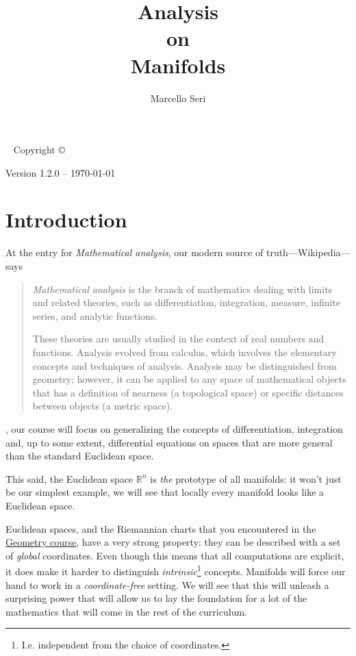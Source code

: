 \documentclass[nobib, a4paper]{tufte-book}
\title{Analysis\\ \noindent
  on\\ \noindent
  Manifolds
}
\author{Marcello Seri}
\theoremstyle{plain}
\theoremstyle{definition}
\theoremstyle{remark}
\newcommand{\R}{\mathbb{R}}
\begin{document}
\maketitlepage

\newpage

\begin{fullwidth}
  ~\vfill
  \thispagestyle{empty}
  \setlength{\parindent}{0pt}
  \setlength{\parskip}{\baselineskip}
  Copyright \copyright\ \the\year\ \thanklessauthor

  \par Version 1.2.0 -- \today

  \vfill
  \small{\doclicenseThis}
\end{fullwidth}

\tableofcontents
\cleardoublepage

\chapter*{Introduction}

At the entry for \emph{Mathematical analysis}, our modern source of truth---Wikipedia---says

\begin{quotation}
  \emph{Mathematical analysis} is the branch of mathematics dealing with limits and related theories, such as differentiation, integration, measure, infinite series, and analytic functions.

  These theories are usually studied in the context of real numbers and functions. Analysis evolved from calculus, which involves the elementary concepts and techniques of analysis. Analysis may be distinguished from geometry; however, it can be applied to any space of mathematical objects that has a definition of nearness (a topological space) or specific distances between objects (a metric space).
\end{quotation}

, our course will focus on generalizing the concepts of differentiation, integration and, up to some extent, differential equations on spaces that are more general than the standard Euclidean space.

This said, the Euclidean space $\R^n$ is \emph{the} prototype of all manifolds: it won't just be our simplest example, we will see that locally every manifold looks like a Euclidean space.

Euclidean spaces, and the Riemannian charts that you encountered in the \href{http://www.rolandvdv.nl/G20/}{Geometry course}, have a very strong property: they can be described with a set of \emph{global} coordinates.
Even though this means that all computations are explicit, it does make it harder to distinguish \emph{intrinsic}\footnote{I.e. independent from the choice of coordinates.} concepts.
Manifolds will force our hand to work in a \emph{coordinate-free} setting.
We will see that this will unleash a surprising power that will allow us to lay the foundation for a lot of the mathematics that will come in the rest of the curriculum.
\end{document}
